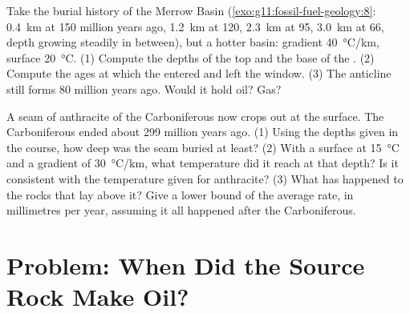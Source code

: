 \begin{exercise}[$\star\star\star$]\label{exo:g11:fossil-fuel-geology:14}
Take the burial history of the Merrow Basin (\cref{exo:g11:fossil-fuel-geology:8}:
\qty{0.4}{km} at 150 million years ago, \qty{1.2}{km} at 120, \qty{2.3}{km}
at 95, \qty{3.0}{km} at 66, depth growing steadily in between), but a
hotter basin: gradient \qty{40}{\degreeCelsius/km}, surface
\qty{20}{\degreeCelsius}. (1) Compute the depths of the top and the base of
the . (2) Compute the ages at which the  entered and
left the window. (3) The anticline still forms 80 million years ago. Would
it hold oil? Gas?
\end{exercise}

\begin{exercise}[$\star\star\star$]\label{exo:g11:fossil-fuel-geology:15}
A seam of anthracite of the Carboniferous now crops out at the surface. The
Carboniferous ended about 299 million years ago. (1) Using the depths given
in the course, how deep was the seam buried at least? (2) With a surface at
\qty{15}{\degreeCelsius} and a gradient of \qty{30}{\degreeCelsius/km},
what temperature did it reach at that depth? Is it consistent with the
temperature given for anthracite? (3) What has happened to the rocks that
lay above it? Give a lower bound of the average rate, in millimetres per
year, assuming it all happened after the Carboniferous.
\end{exercise}

\section{Problem: When Did the Source Rock Make Oil?}

